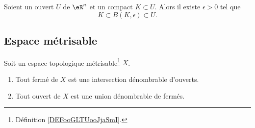 \begin{proposition}	\label{PROPooYTMRooExvGrN}
	Soient un ouvert \( U\) de \( \eR^n\) et un compact \( K\subset U\). Alors il existe \( \epsilon>0\) tel que
	\begin{equation}
		K\subset B(K,\epsilon)\subset U.
	\end{equation}
\end{proposition}


\subsection{Espace métrisable}

\begin{proposition}      \label{PROPooXWBTooCvGLOj}
	Soit un espace topologique métrisable\footnote{Définition \ref{DEFooGLTUooJjaSmI}.} \( X\).
	\begin{enumerate}
		\item   \label{ITEMooOXVRooBsKwuq}
		      Tout fermé de \( X\) est une intersection dénombrable d'ouverts.
		\item
		      Tout ouvert de \( X\) est une union dénombrable de fermés.
	\end{enumerate}
\end{proposition}

